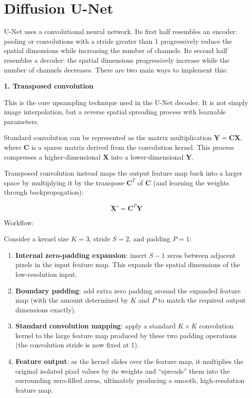 \setcounter{section}{2}

\hypertarget{diffusion-u-net}{%
\section{Diffusion U-Net}\label{diffusion-u-net}}

U-Net uses a convolutional neural network. Its first half resembles an encoder: pooling or convolutions with a stride greater than 1 progressively reduce the spatial dimensions while increasing the number of channels. Its second half resembles a decoder: the spatial dimensions progressively increase while the number of channels decreases. There are two main ways to implement this:

\textbf{1. Transposed convolution}

This is the core upsampling technique used in the U-Net decoder. It is not simply image interpolation, but a reverse spatial spreading process with learnable parameters.

Standard convolution can be represented as the matrix multiplication \(\mathbf{Y}=\mathbf{C}\mathbf{X}\), where \(\mathbf{C}\) is a sparse matrix derived from the convolution kernel. This process compresses a higher-dimensional \(\mathbf{X}\) into a lower-dimensional \(\mathbf{Y}\).

Transposed convolution instead maps the output feature map back into a larger space by multiplying it by the transpose \(\mathbf{C}^T\) of \(\mathbf{C}\) (and learning the weights through backpropagation):

\[
\mathbf{X}'=\mathbf{C}^T\mathbf{Y}
\]

Workflow:

Consider a kernel size \(K=3\), stride \(S=2\), and padding \(P=1\):

\begin{enumerate}
\def\labelenumi{\arabic{enumi}.}
\tightlist
\item
  \textbf{Internal zero-padding expansion}: insert \(S-1\) zeros between adjacent pixels in the input feature map. This expands the spatial dimensions of the low-resolution input.
\item
  \textbf{Boundary padding}: add extra zero padding around the expanded feature map (with the amount determined by \(K\) and \(P\) to match the required output dimensions exactly).
\item
  \textbf{Standard convolution mapping}: apply a standard \(K\times K\) convolution kernel to the large feature map produced by these two padding operations (the convolution stride is now fixed at 1).
\item
  \textbf{Feature output}: as the kernel slides over the feature map, it multiplies the original isolated pixel values by its weights and ``spreads'' them into the surrounding zero-filled areas, ultimately producing a smooth, high-resolution feature map.
\end{enumerate}

